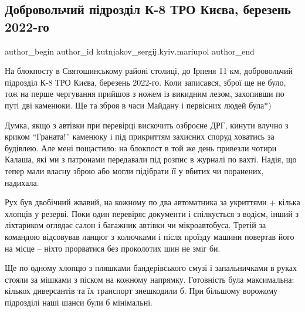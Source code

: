  
 
 
 
 

\subsection{Добровольчий підрозділ К-8 ТРО Києва, березень 2022-го}
\label{sec:22_03_2023.fb.kutnjakov_sergij.kyiv.mariupol.1.dobrovolchii_p_drozd}

\ifcmt
 author_begin
   author_id kutnjakov_sergij.kyiv.mariupol
 author_end
\fi

На блокпосту в Святошинському районі столиці, до Ірпеня 11 км, добровольчий
підрозділ К-8 ТРО Києва, березень 2022-го. Коли записався, зброї ще не було,
тож на перше чергування прийшов з ножем із викидним лезом, захопивши по путі
дві каменюки. Ще та зброя в часи Майдану і первісних людей була*)

Думка, якщо з автівки при перевірці вискочить озброєне ДРГ, кинути влучно з
криком \enquote{Граната!} каменюку і під прикриттям захисних споруд ховатись за
будівлею. Але мені пощастило: на блокпост в той же день привезли чотири Калаша,
які ми з патронами передавали під розпис в журналі по вахті. Надія, що тепер
мали власну зброю або могли підібрати її у вбитих чи поранених, надихала.


Рух був двобічний жвавий, на кожному по два автоматника за укриттями + кілька
хлопців у резерві. Поки один перевіряє документи і спілкується з водієм, інший
з ліхтариком оглядає салон і багажник автівки чи мікроавтобуса. Третій за
командою відсовував ланцюг з колючками і після проїзду машини повертав його на
місце – ніхто прорватися без проколотих шин не зміг би.

Ще по одному хлопцю з пляшками бандерівського смузі і запальничками в руках
стояли за мішками з піском на кожному напрямку. Готовність була максимальна:
кількох диверсантів та їх транспорт знешкодили б. При більшому ворожому
підрозділі наші шанси були б мінімальні.

